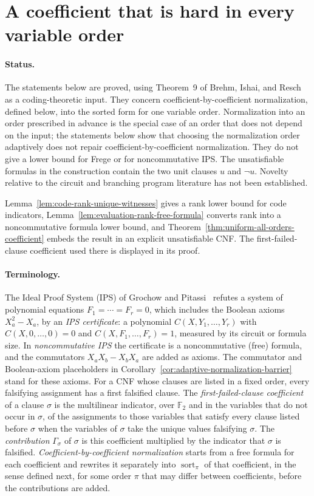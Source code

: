 \documentclass[11pt]{article}
\theoremstyle{definition}
\theoremstyle{remark}
\begin{document}
\section{A coefficient that is hard in every variable order}
\label{sec:all-orders-coefficient-barrier}

\paragraph{Status.}
The statements below are proved, using Theorem~9 of Brehm, Ishai,
and Resch~\cite{bir} as a coding-theoretic input. They concern
coefficient-by-coefficient normalization, defined below, into the
sorted form for one variable order. Normalization into an order
prescribed in advance is the special case of an order that does not
depend on the input; the statements below show that choosing the
normalization order adaptively does not repair coefficient-by-coefficient
normalization. They do not give a lower bound for Frege or for
noncommutative IPS.
The unsatisfiable formulas in the construction contain the two unit
clauses $u$ and $\neg u$. Novelty relative to the circuit and branching
program literature has not been established.

Lemma~\ref{lem:code-rank-unique-witnesses} gives a rank lower bound
for code indicators, Lemma~\ref{lem:evaluation-rank-free-formula}
converts rank into a noncommutative formula lower bound, and
Theorem~\ref{thm:uniform-all-orders-coefficient} embeds the result in
an explicit unsatisfiable CNF. The first-failed-clause coefficient
used there is displayed in its proof.

\paragraph{Terminology.}
The Ideal Proof System (IPS) of Grochow and Pitassi~\cite{gp} refutes
a system of polynomial equations $F_1=\cdots=F_r=0$, which includes
the Boolean axioms $X_a^2-X_a$, by an \emph{IPS certificate}: a
polynomial $C(X,Y_1,\ldots,Y_r)$ with $C(X,0,\ldots,0)=0$ and
$C(X,F_1,\ldots,F_r)=1$, measured by its circuit or formula size. In
\emph{noncommutative IPS} the certificate is a noncommutative (free)
formula, and the commutators $X_aX_b-X_bX_a$ are added as axioms.
The commutator and Boolean-axiom placeholders in
Corollary~\ref{cor:adaptive-normalization-barrier} stand for these
axioms.
For a CNF whose clauses are listed in a fixed order, every falsifying
assignment has a first falsified clause. The
\emph{first-failed-clause coefficient} of a clause $\sigma$ is the
multilinear indicator, over $\mathbb F_2$ and in the variables that do
not occur in $\sigma$, of the assignments to those variables that
satisfy every clause listed before $\sigma$ when the variables of
$\sigma$ take the unique values falsifying $\sigma$. The
\emph{contribution} $\Gamma_\sigma$ of $\sigma$ is this coefficient
multiplied by the indicator that $\sigma$ is falsified.
\emph{Coefficient-by-coefficient normalization} starts from a free
formula for each coefficient and rewrites it separately into
$\operatorname{sort}_\pi$ of that coefficient, in the sense defined
next, for some order $\pi$ that may differ between coefficients,
before the contributions are added.
\end{document}
